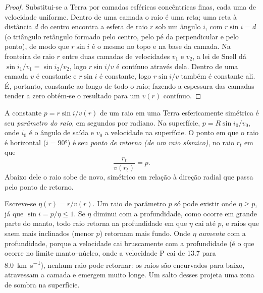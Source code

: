 \begin{proof}
Substitui-se a Terra por camadas esféricas concêntricas finas, cada uma de velocidade uniforme. Dentro de uma
camada o raio é uma reta; uma reta à distância $d$ do
centro encontra a esfera de raio $r$ sob um ângulo $i$, com
$r\sin i = d$ (o triângulo retângulo formado pelo centro, pelo pé da
perpendicular e pelo ponto), de modo que $r\sin i$ é o mesmo no topo e na
base da camada. Na fronteira de raio $r$ entre duas camadas de
velocidades $v_1$ e $v_2$, a lei de Snell dá $\sin i_1/v_1 = \sin i_2/v_2$, logo
$r\sin i/v$ é contínuo através dela. Dentro de uma camada $v$ é constante e
$r\sin i$ é constante, logo $r\sin i/v$ também é constante ali. É, portanto,
constante ao longo de todo o raio; fazendo a espessura das camadas tender a
zero obtém-se o resultado para um $v(r)$ contínuo.
\end{proof}

\begin{definition}\label{def:b3:seismology-imaging:ray-parameter}
A constante $p = r\sin i/v(r)$ de um raio em uma Terra esfericamente simétrica é
seu \emph{parâmetro do raio}, em segundos por radiano. Na
superfície, $p = R\sin i_0/v_0$, onde $i_0$ é o ângulo de saída e $v_0$
a velocidade na superfície. O ponto em que o raio é horizontal ($i = \ang{90}$)
é seu \emph{ponto de retorno (de um raio sísmico)},
no raio $r_t$ em que
\[
  \frac{r_t}{v(r_t)} = p .
\]
Abaixo dele o raio sobe de novo, simétrico em relação à direção radial que passa pelo
ponto de retorno.
\end{definition}

Escreve-se $\eta(r) = r/v(r)$. Um raio de parâmetro $p$ só pode existir onde
$\eta \ge p$, já que $\sin i = p/\eta \le 1$. Se $\eta$ diminui com a profundidade, como
ocorre em grande parte do manto, todo raio retorna na profundidade em que $\eta$
cai até $p$, e raios que saem mais inclinados (menor $p$) retornam mais fundo.
Onde $\eta$ \emph{aumenta} com a profundidade, porque a velocidade cai bruscamente com a
profundidade (é o que ocorre no limite manto--núcleo, onde a velocidade P cai de
13.7 para \qty{8.0}{km.s^{-1}}), %
nenhum raio pode retornar: os raios são encurvados para baixo, atravessam a camada e emergem muito longe.
Um salto desses projeta uma zona de sombra na superfície.

